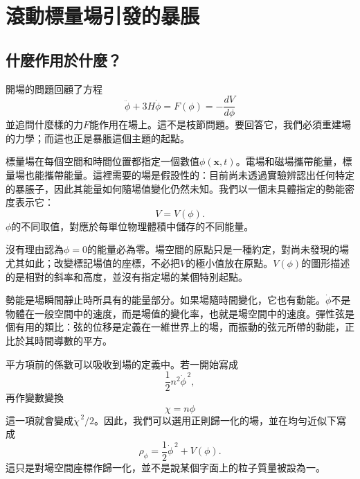 \chapter{滾動標量場引發的暴脹}


\section{什麼作用於什麼？}

開場的問題回顧了方程
\begin{equation}
\ddot\phi+3H\dot\phi
=F(\phi)
=-\frac{dV}{d\phi}
\label{eq:c09-opening}
\end{equation}
並追問什麼樣的力\(F\)能作用在場上。這不是枝節問題。要回答它，我們必須重建場的力學；而這也正是暴脹這個主題的起點。

標量場在每個空間和時間位置都指定一個數值\(\phi(\mathbf x,t)\)。電場和磁場攜帶能量，標量場也能攜帶能量。這裡需要的場是假設性的：目前尚未透過實驗辨認出任何特定的暴脹子，因此其能量如何隨場值變化仍然未知。我們以一個未具體指定的勢能密度表示它：
\begin{equation}
V=V(\phi).
\label{eq:c09-potential}
\end{equation}
\(\phi\)的不同取值，對應於每單位物理體積中儲存的不同能量。

沒有理由認為\(\phi=0\)的能量必為零。場空間的原點只是一種約定，對尚未發現的場尤其如此；改變標記場值的座標，不必把\(V\)的極小值放在原點。\(V(\phi)\)的圖形描述的是相對的斜率和高度，並沒有指定場的某個特別起點。

勢能是場瞬間靜止時所具有的能量部分。如果場隨時間變化，它也有動能。\(\dot\phi\)不是物體在一般空間中的速度，而是場值的變化率，也就是場空間中的速度。彈性弦是個有用的類比：弦的位移是定義在一維世界上的場，而振動的弦元所帶的動能，正比於其時間導數的平方。

平方項前的係數可以吸收到場的定義中。若一開始寫成
\begin{equation}
\frac12 n^2\dot\phi^{\,2},
\end{equation}
再作變數變換
\begin{equation}
\chi=n\phi
\end{equation}
這一項就會變成\(\dot\chi^{\,2}/2\)。因此，我們可以選用正則歸一化的場，並在均勻近似下寫成
\begin{equation}
\rho_\phi=\frac12\dot\phi^{\,2}+V(\phi).
\label{eq:c09-rho-homogeneous}
\end{equation}
這只是對場空間座標作歸一化，並不是說某個字面上的粒子質量被設為一。

